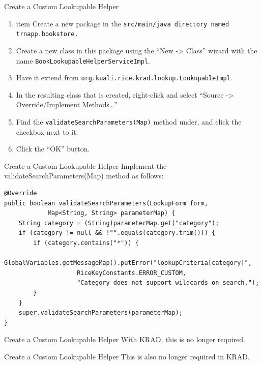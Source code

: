 \documentclass[xcolor=dvipsnames,14pt,professionalfonts]{beamer}
\begin{document}
  \begin{frame}{Create a Custom Lookupable Helper}
 \begin{enumerate}
 \item item Create a new package in the \texttt{src/main/java directory named trnapp.bookstore.}
 \item Create a new class in this package using the “New -> Class”
   wizard with the name \texttt{BookLookupableHelperServiceImpl}.  
 \item Have it extend from \texttt{org.kuali.rice.krad.lookup.LookupableImpl}.
 \item In the resulting class that is created, right-click and select “Source -> Override/Implement Methods…”
 \item Find the \texttt{validateSearchParameters(Map)} method under, and click the checkbox next to it.
 \item Click the “OK” button.
   \end{enumerate}
   \end{frame}

\begin{frame}[fragile]{Create a Custom Lookupable Helper}
 Implement the validateSearchParameters(Map) method as follows:
    \begin{verbatim}
@Override
public boolean validateSearchParameters(LookupForm form,
			Map<String, String> parameterMap) {
	String category = (String)parameterMap.get("category");
	if (category != null && !"".equals(category.trim())) {
		if (category.contains("*")) {
			GlobalVariables.getMessageMap().putError("lookupCriteria[category]", 
                    RiceKeyConstants.ERROR_CUSTOM, 
                    "Category does not support wildcards on search.");
		}
	}
	super.validateSearchParameters(parameterMap);
}
    \end{verbatim}
\end{frame}

\begin{frame}[fragile]{Create a Custom Lookupable Helper}
  With KRAD, this is no longer required.
\end{frame}

\begin{frame}[fragile]{Create a Custom Lookupable Helper}
  This is also no longer required in KRAD.
\end{frame}
\end{document}
